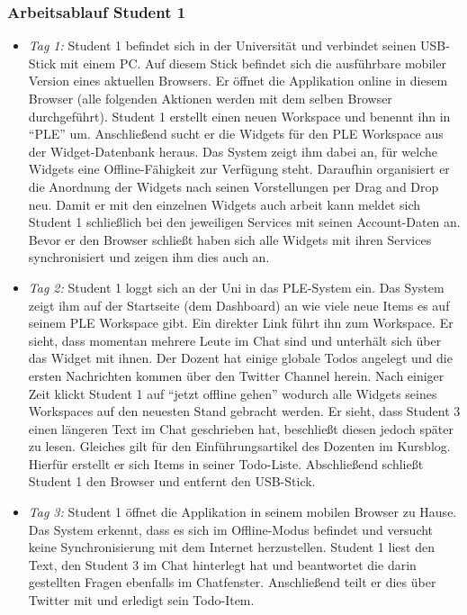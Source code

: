 \subsubsection{Arbeitsablauf Student 1}
\begin{itemize}
 \item \emph{Tag 1:} Student 1 befindet sich in der Universität und verbindet seinen USB-Stick mit einem PC. Auf diesem Stick befindet sich die ausführbare mobiler Version eines aktuellen Browsers. Er öffnet die Applikation online in diesem Browser (alle folgenden Aktionen werden mit dem selben Browser durchgeführt). Student 1 erstellt einen neuen Workspace und benennt ihn in "`PLE"' um. Anschließend sucht er die Widgets für den PLE Workspace aus der Widget-Datenbank heraus. Das System zeigt ihm dabei an, für welche Widgets eine Offline-Fähigkeit zur Verfügung steht. Daraufhin organisiert er die Anordnung der Widgets nach seinen Vorstellungen per Drag and Drop neu. Damit er mit den einzelnen Widgets auch arbeit kann meldet sich Student 1 schließlich bei den jeweiligen Services mit seinen Account-Daten an. Bevor er den Browser schließt haben sich alle Widgets mit ihren Services synchronisiert und zeigen ihm dies auch an.
 \item \emph{Tag 2:} Student 1 loggt sich an der Uni in das PLE-System ein. Das System zeigt ihm auf der Startseite (dem Dashboard) an wie viele neue Items es auf seinem PLE Workspace gibt. Ein direkter Link führt ihn zum Workspace. Er sieht, dass momentan mehrere Leute im Chat sind und unterhält sich über das Widget mit ihnen. Der Dozent hat einige globale Todos angelegt und die ersten Nachrichten kommen über den Twitter Channel herein. Nach einiger Zeit klickt Student 1 auf “jetzt offline gehen” wodurch alle Widgets seines Workspaces auf den neuesten Stand gebracht werden. Er sieht, dass Student 3 einen längeren Text im Chat geschrieben hat, beschließt diesen jedoch später zu lesen. Gleiches gilt für den Einführungsartikel des Dozenten im Kursblog. Hierfür erstellt er sich Items in seiner Todo-Liste. Abschließend schließt Student 1 den Browser und entfernt den USB-Stick.
 \item \emph{Tag 3:} Student 1 öffnet die Applikation in seinem mobilen Browser zu Hause. Das System erkennt, dass es sich im Offline-Modus befindet und versucht keine Synchronisierung mit dem Internet herzustellen. Student 1 liest den Text, den Student 3 im Chat hinterlegt hat und beantwortet die darin gestellten Fragen ebenfalls im Chatfenster. Anschließend teilt er dies über Twitter mit und erledigt sein Todo-Item.

\end{itemize}
